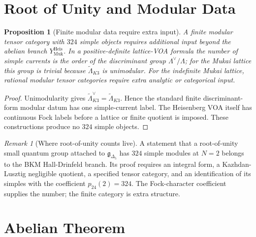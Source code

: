 \documentclass[11pt]{article}
\newtheorem{proposition}[theorem]{Proposition}
\theoremstyle{definition}
\theoremstyle{remark}
\newtheorem{remark}[theorem]{Remark}
\newcommand{\gDel}{\mathfrak{g}_{\Delta_5}}
\newcommand{\Lmuk}{\widetilde{\Lambda}_{K3}}
\newcommand{\YHeis}{Y^{\mathrm{Heis}}_{\mathrm{Muk}}}
\begin{document}
\section{Root of Unity and Modular Data}
\label{sec:root-of-unity}

\begin{proposition}[Finite modular data require extra input]
\label{prop:no-abelian-324-module-theorem}
A finite modular tensor category with $324$ simple objects requires
additional input beyond the abelian branch $\YHeis$. In a
positive-definite lattice-VOA formula the number of simple currents is
the order of the discriminant group $\Lambda^\vee/\Lambda$; for the
Mukai lattice this group is trivial because $\Lmuk$ is unimodular. For
the indefinite Mukai lattice, rational modular tensor categories require
extra analytic or categorical input.
\end{proposition}

\begin{proof}
Unimodularity gives $\Lmuk^\vee=\Lmuk$. Hence the standard finite
discriminant-form modular datum has one simple-current label. The
Heisenberg VOA itself has continuous Fock labels before a lattice or
finite quotient is imposed. These constructions produce no $324$ simple
objects.
\end{proof}

\begin{remark}[Where root-of-unity counts live]
\label{rem:root-of-unity-counts}
A statement that a root-of-unity small quantum group attached to
$\gDel$ has $324$ simple modules at $N=2$ belongs to the BKM
Hall-Drinfeld branch. Its proof requires an integral form, a
Kazhdan-Lusztig negligible quotient, a specified tensor category, and
an identification of its simples with the coefficient
$p_{24}(2)=324$. The Fock-character coefficient supplies the number;
the finite category is extra structure.
\end{remark}

\section{Abelian Theorem}
\label{sec:abelian-theorem}
\end{document}
